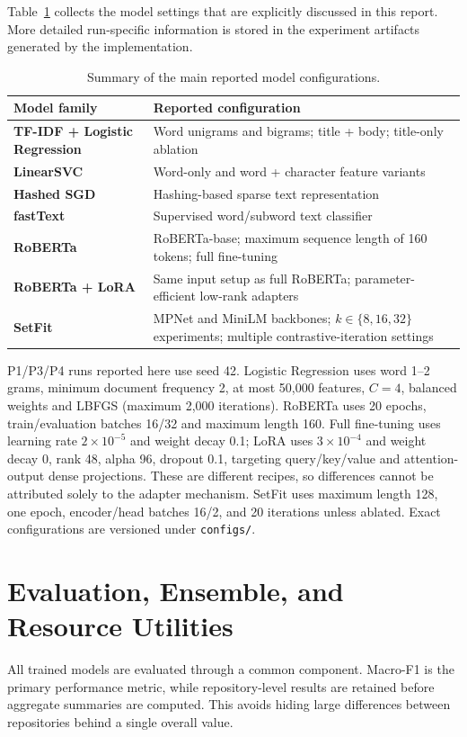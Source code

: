 Table~\ref{tab:configuration-summary} collects the model settings that are explicitly discussed in this report. More detailed run-specific information is stored in the experiment artifacts generated by the implementation.

\begin{table}[H]
\centering
\caption{Summary of the main reported model configurations.}
\label{tab:configuration-summary}
\begin{tabularx}{\textwidth}{>{\bfseries}l X}
\toprule
Model family & Reported configuration \\
\midrule
TF-IDF + Logistic Regression & Word unigrams and bigrams; title + body; title-only ablation \\
LinearSVC & Word-only and word + character feature variants \\
Hashed SGD & Hashing-based sparse text representation \\
fastText & Supervised word/subword text classifier \\
RoBERTa & RoBERTa-base; maximum sequence length of 160 tokens; full fine-tuning \\
RoBERTa + LoRA & Same input setup as full RoBERTa; parameter-efficient low-rank adapters \\
SetFit & MPNet and MiniLM backbones; $k \in \{8,16,32\}$ experiments; multiple contrastive-iteration settings \\
\bottomrule
\end{tabularx}
\end{table}

P1/P3/P4 runs reported here use seed 42. Logistic Regression uses word 1--2 grams, minimum document frequency 2, at most 50,000 features, $C=4$, balanced weights and LBFGS (maximum 2,000 iterations). RoBERTa uses 20 epochs, train/evaluation batches 16/32 and maximum length 160. Full fine-tuning uses learning rate $2\times10^{-5}$ and weight decay 0.1; LoRA uses $3\times10^{-4}$ and weight decay 0, rank 48, alpha 96, dropout 0.1, targeting query/key/value and attention-output dense projections. These are different recipes, so differences cannot be attributed solely to the adapter mechanism. SetFit uses maximum length 128, one epoch, encoder/head batches 16/2, and 20 iterations unless ablated. Exact configurations are versioned under \texttt{configs/}.

\section{Evaluation, Ensemble, and Resource Utilities}
All trained models are evaluated through a common component. Macro-F1 is the primary performance metric, while repository-level results are retained before aggregate summaries are computed. This avoids hiding large differences between repositories behind a single overall value.

